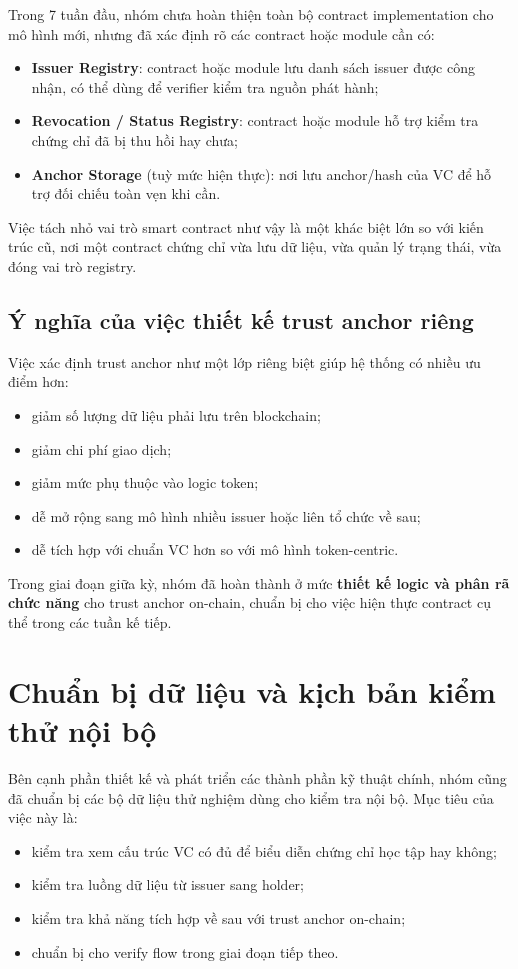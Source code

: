 Trong 7 tuần đầu, nhóm chưa hoàn thiện toàn bộ contract implementation cho mô hình mới, nhưng đã xác định rõ các contract hoặc module cần có:
\begin{itemize}
    \item \textbf{Issuer Registry}: contract hoặc module lưu danh sách issuer được công nhận, có thể dùng để verifier kiểm tra nguồn phát hành;
    \item \textbf{Revocation / Status Registry}: contract hoặc module hỗ trợ kiểm tra chứng chỉ đã bị thu hồi hay chưa;
    \item \textbf{Anchor Storage} (tuỳ mức hiện thực): nơi lưu anchor/hash của VC để hỗ trợ đối chiếu toàn vẹn khi cần.
\end{itemize}

Việc tách nhỏ vai trò smart contract như vậy là một khác biệt lớn so với kiến trúc cũ, nơi một contract chứng chỉ vừa lưu dữ liệu, vừa quản lý trạng thái, vừa đóng vai trò registry.

\subsection{Ý nghĩa của việc thiết kế trust anchor riêng}

Việc xác định trust anchor như một lớp riêng biệt giúp hệ thống có nhiều ưu điểm hơn:
\begin{itemize}
    \item giảm số lượng dữ liệu phải lưu trên blockchain;
    \item giảm chi phí giao dịch;
    \item giảm mức phụ thuộc vào logic token;
    \item dễ mở rộng sang mô hình nhiều issuer hoặc liên tổ chức về sau;
    \item dễ tích hợp với chuẩn VC hơn so với mô hình token-centric.
\end{itemize}

Trong giai đoạn giữa kỳ, nhóm đã hoàn thành ở mức \textbf{thiết kế logic và phân rã chức năng} cho trust anchor on-chain, chuẩn bị cho việc hiện thực contract cụ thể trong các tuần kế tiếp.

\section{Chuẩn bị dữ liệu và kịch bản kiểm thử nội bộ}

Bên cạnh phần thiết kế và phát triển các thành phần kỹ thuật chính, nhóm cũng đã chuẩn bị các bộ dữ liệu thử nghiệm dùng cho kiểm tra nội bộ. Mục tiêu của việc này là:
\begin{itemize}
    \item kiểm tra xem cấu trúc VC có đủ để biểu diễn chứng chỉ học tập hay không;
    \item kiểm tra luồng dữ liệu từ issuer sang holder;
    \item kiểm tra khả năng tích hợp về sau với trust anchor on-chain;
    \item chuẩn bị cho verify flow trong giai đoạn tiếp theo.
\end{itemize}

